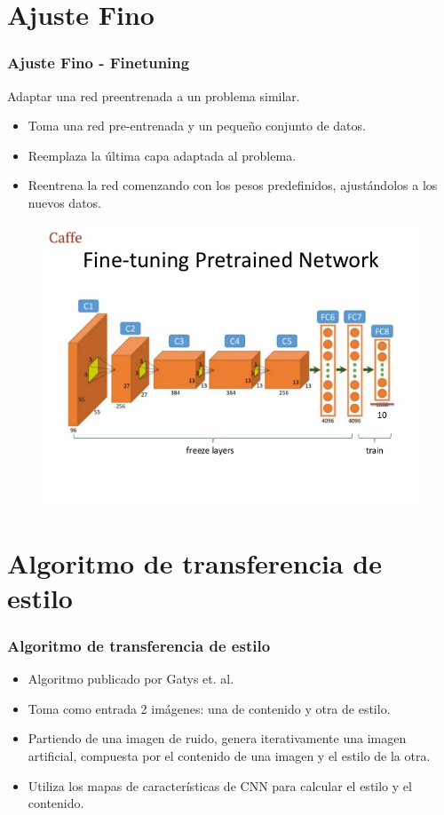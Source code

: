 \documentclass[10pt,center]{beamer}
\begin{document}
\section{Ajuste Fino}
\begin{frame}
  \frametitle{Ajuste Fino - Finetuning}
  Adaptar una red preentrenada a un problema similar.
    \begin{itemize}
     \item Toma una red pre-entrenada y un pequeño conjunto de datos.
     \item Reemplaza la última capa adaptada al problema.
     \item Reentrena la red comenzando con los pesos predefinidos, ajustándolos a los nuevos datos.
    \end{itemize}
  \begin{figure}[h]
    \begin{center}
      \includegraphics[height=0.6\textheight]{./img/fine_tuning.jpg}
    \end{center}
  \end{figure}
\end{frame}


\section{Algoritmo de transferencia de estilo}
\begin{frame}
 \frametitle{Algoritmo de transferencia de estilo}
 \begin{itemize}
    \item Algoritmo publicado por Gatys et. al.
    \item Toma como entrada 2 imágenes: una de contenido y otra de estilo.
    \item Partiendo de una imagen de ruido, genera iterativamente una imagen artificial, compuesta por el contenido de una imagen y el estilo de la otra.
    \item Utiliza los mapas de características de CNN para calcular el estilo y el contenido.
 \end{itemize}
\end{frame}
\end{document}
